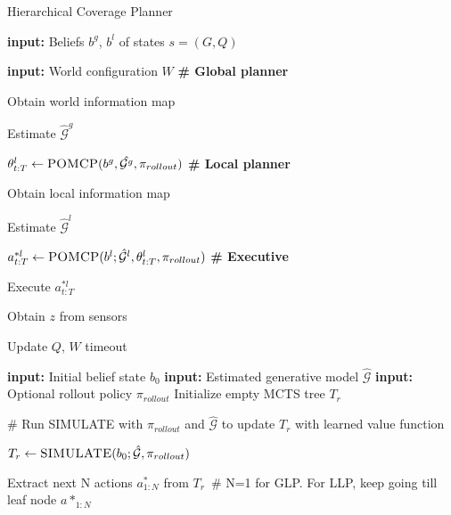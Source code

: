



\begin{algorithm}[t!]
\caption{Hierarchical Coverage Planner}
\label{alg:hierarchicalPlanner}
\begin{algorithmic}
\STATE {}
\item \textbf{input: }Beliefs $b^g$, $b^l$ of states $s=(G, Q)$
\item \textbf{input: }World configuration $W$
\REPEAT
    \STATE \textbf{\# Global planner}
    \item  Obtain world information map
    \item Estimate $\hat{\mathcal{G}}^g$
    \item $\theta^l_{t:T} \gets \textsc{POMCP}(b^g, \hat{\mathcal{G}^g}, \pi_{rollout})$
    \STATE \textbf{\# Local planner}
    \item Obtain local information map
    \item Estimate $\hat{\mathcal{G}}^l$
    \item $a_{t:T}^{*l} \gets \textsc{POMCP}(b^l;\hat{\mathcal{G}}^l, \theta^l_{t:T}, \pi_{rollout})$ 
    \STATE \textbf{\# Executive}
    \item Execute $a_{t:T}^{*l}$
    \item Obtain $z$ from sensors
    \item Update $Q$, $W$
\UNTIL timeout
\end{algorithmic}

\begin{algorithmic}
\STATE {}
\STATE \textbf{input: }Initial belief state $b_0$
\STATE \textbf{input: }Estimated generative model $\hat{\mathcal{G}}$
\STATE \textbf{input: }Optional rollout policy $\pi_{rollout}$
\STATE Initialize empty MCTS tree $T_r$
\REPEAT
    \item \# Run SIMULATE with $\pi_{rollout}$ and $\hat{\mathcal{G}}$ to update $T_r$ with learned value function
    \item $T_r \gets \textsc{SIMULATE}(b_0; \hat{\mathcal{G}}, \pi_{rollout})$
\item Extract next N actions $a^*_{1:N}$ from $T_r$ \,\# N=1 for GLP. For LLP, keep going till leaf node
\RETURN $a*_{1:N}$
\end{algorithmic}

\end{algorithm}
